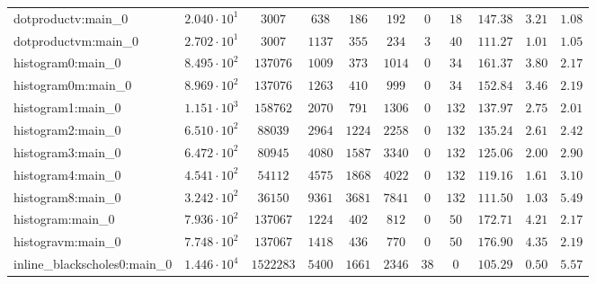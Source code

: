 \begin{tabular}{|l|c|c|c|c|c|c|c|c|c|c|}
dotproductv:main\_0            & $ 2.040 \cdot 10^{1} $ & $ 3007     $ & $ 638    $ & $ 186    $ & $ 192    $ & $ 0    $ & $ 18   $ & $ 147.38      $ & $ 3.21    $ & $ 1.08    $ \\
dotproductvm:main\_0           & $ 2.702 \cdot 10^{1} $ & $ 3007     $ & $ 1137   $ & $ 355    $ & $ 234    $ & $ 3    $ & $ 40   $ & $ 111.27      $ & $ 1.01    $ & $ 1.05    $ \\
histogram0:main\_0             & $ 8.495 \cdot 10^{2} $ & $ 137076   $ & $ 1009   $ & $ 373    $ & $ 1014   $ & $ 0    $ & $ 34   $ & $ 161.37      $ & $ 3.80    $ & $ 2.17    $ \\
histogram0m:main\_0            & $ 8.969 \cdot 10^{2} $ & $ 137076   $ & $ 1263   $ & $ 410    $ & $ 999    $ & $ 0    $ & $ 34   $ & $ 152.84      $ & $ 3.46    $ & $ 2.19    $ \\
histogram1:main\_0             & $ 1.151 \cdot 10^{3} $ & $ 158762   $ & $ 2070   $ & $ 791    $ & $ 1306   $ & $ 0    $ & $ 132  $ & $ 137.97      $ & $ 2.75    $ & $ 2.01    $ \\
histogram2:main\_0             & $ 6.510 \cdot 10^{2} $ & $ 88039    $ & $ 2964   $ & $ 1224   $ & $ 2258   $ & $ 0    $ & $ 132  $ & $ 135.24      $ & $ 2.61    $ & $ 2.42    $ \\
histogram3:main\_0             & $ 6.472 \cdot 10^{2} $ & $ 80945    $ & $ 4080   $ & $ 1587   $ & $ 3340   $ & $ 0    $ & $ 132  $ & $ 125.06      $ & $ 2.00    $ & $ 2.90    $ \\
histogram4:main\_0             & $ 4.541 \cdot 10^{2} $ & $ 54112    $ & $ 4575   $ & $ 1868   $ & $ 4022   $ & $ 0    $ & $ 132  $ & $ 119.16      $ & $ 1.61    $ & $ 3.10    $ \\
histogram8:main\_0             & $ 3.242 \cdot 10^{2} $ & $ 36150    $ & $ 9361   $ & $ 3681   $ & $ 7841   $ & $ 0    $ & $ 132  $ & $ 111.50      $ & $ 1.03    $ & $ 5.49    $ \\
histogram:main\_0              & $ 7.936 \cdot 10^{2} $ & $ 137067   $ & $ 1224   $ & $ 402    $ & $ 812    $ & $ 0    $ & $ 50   $ & $ 172.71      $ & $ 4.21    $ & $ 2.17    $ \\
histogravm:main\_0             & $ 7.748 \cdot 10^{2} $ & $ 137067   $ & $ 1418   $ & $ 436    $ & $ 770    $ & $ 0    $ & $ 50   $ & $ 176.90      $ & $ 4.35    $ & $ 2.19    $ \\
inline\_blackscholes0:main\_0  & $ 1.446 \cdot 10^{4} $ & $ 1522283  $ & $ 5400   $ & $ 1661   $ & $ 2346   $ & $ 38   $ & $ 0    $ & $ 105.29      $ & $ 0.50    $ & $ 5.57    $ \\

\end{tabular}
